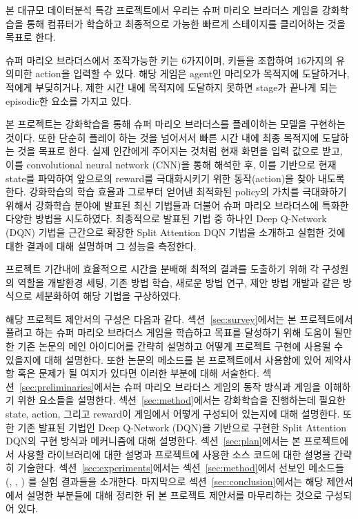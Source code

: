 본 대규모 데이터분석 특강 프로젝트에서 우리는 슈퍼 마리오 브라더스 게임을 강화학습을 통해 컴퓨터가 학습하고 최종적으로 가능한 빠르게 스테이지를 클리어하는 것을 목표로 한다.

슈퍼 마리오 브라더스에서 조작가능한 키는 6가지이며, 키들을 조합하여 16가지의 유의미한 action을 입력할 수 있다.
해당 게임은 agent인 마리오가 목적지에 도달하거나, 적에게 부딪히거나, 제한 시간 내에 목적지에 도달하지 못하면 stage가 끝나게 되는 episodic한 요소를 가지고 있다. 

본 프로젝트는 강화학습을 통해 슈퍼 마리오 브라더스를 플레이하는 모델을 구현하는 것이다.
또한 단순히 플레이 하는 것을 넘어서서 빠른 시간 내에 최종 목적지에 도달하는 것을 목표로 한다. 
실제 인간에게 주어지는 것처럼 현재 화면을 입력 값으로 받고, 이를 convolutional neural network (CNN)을 통해 해석한 후, 이를 기반으로 현재 state를 파악하여 앞으로의 reward를 극대화시키기 위한 동작(action)을 찾아 내도록 한다.
강화학습의 학습 효율과 그로부터 얻어낸 최적화된 policy의 가치를 극대화하기 위해서 강화학습 분야에 발표된 최신 기법들과 더불어 슈퍼 마리오 브라더스에 특화한 다양한 방법을 시도하였다.
최종적으로 발표된 기법 중 하나인 Deep Q-Network (DQN) 기법을 근간으로 확장한 Split Attention DQN 기법을 소개하고 실험한 것에 대한 결과에 대해 설명하며 그 성능을 측정한다. 

프로젝트 기간내에 효율적으로 시간을 분배해 최적의 결과를 도출하기 위해 각 구성원의 역할을 개발환경 세팅, 기존 방법 학습, 새로운 방법 연구, 제안 방법 개발과 같은 방식으로 세분화하여 해당 기법을 구상하였다.

해당 프로젝트 제안서의 구성은 다음과 같다. 
섹션~\ref{sec:survey}에서는 본 프로젝트에서 풀려고 하는 슈퍼 마리오 브라더스 게임을 학습하고 목표를 달성하기 위해 도움이 될만한 기존 논문의 메인 아이디어를 간략히 설명하고 어떻게 프로젝트 구현에 사용될 수 있을지에 대해 설명한다. 
또한 논문의 메소드를 본 프로젝트에서 사용함에 있어 제약사항 혹은 문제가 될 여지가 있다면 이러한 부분에 대해 서술한다. 
섹션~\ref{sec:preliminaries}에서는 슈퍼 마리오 브라더스 게임의 동작 방식과 게임을 이해하기 위한 요소들을 설명한다.
섹션~\ref{sec:method}에서는 강화학습을 진행하는데 필요한 state, action, 그리고 reward이 게임에서 어떻게 구성되어 있는지에 대해 설명한다. 
또한 기존 발표된 기법인 Deep Q-Network (DQN)을 기반으로 구현한 Split Attention DQN의 구현 방식과 메커니즘에 대해 설명한다.
섹션~\ref{sec:plan}에서는 본 프로젝트에서 사용할 라이브러리에 대한 설명과 프로젝트에 사용한 소스 코드에 대한 설명을 간략히 기술한다.
섹션~\ref{sec:experiments}에서는 섹션~\ref{sec:method}에서 선보인 메소드들 (\dqnname, \sdqnname, \sadqnname) 를 실험 결과들을 소개한다.
마지막으로 섹션~\ref{sec:conclusion}에서는 해당 제안서에서 설명한 부분들에 대해 정리한 뒤 본 프로젝트 제안서를 마무리하는 것으로 구성되어 있다.

